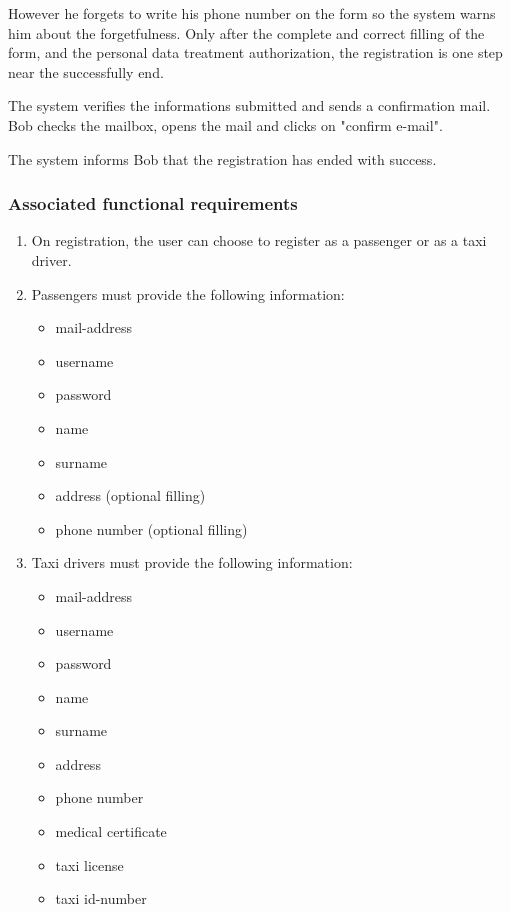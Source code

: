 However he forgets to write his phone number on the form so the system warns him about the forgetfulness.
Only after the complete and correct filling of the form, and the personal data treatment authorization, the registration is one step near the successfully end.

The system verifies the informations submitted and sends a confirmation mail.
Bob checks the mailbox, opens the mail and clicks on "confirm e-mail". 

The system informs Bob that the registration has ended with success.

\subsubsection{Associated functional requirements}

\begin{enumerate}
    \item On registration, the user can choose to register as a passenger or as a taxi driver.
    \item Passengers must provide the following information:
    \begin{itemize}
        \item mail-address
        \item username 
        \item password
        \item name
        \item surname
        \item address (optional filling)
        \item phone number (optional filling)
    \end{itemize}
    \item Taxi drivers must provide the following information:
    \begin{itemize}
        \item mail-address
        \item username 
        \item password
        \item name
        \item surname
        \item address 
        \item phone number
        \item medical certificate
        \item taxi license
        \item taxi id-number

\end{itemize}
\end{enumerate}
